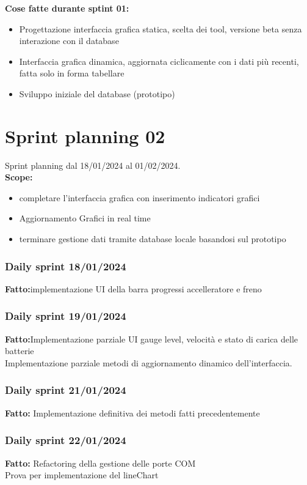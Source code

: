 \documentclass{report}
\begin{document}
\textbf{Cose fatte durante sptint 01:}
\begin{itemize}
\item Progettazione interfaccia grafica statica, scelta dei tool, versione beta senza interazione con il database
\item Interfaccia grafica dinamica, aggiornata ciclicamente con i dati più recenti, fatta solo in forma tabellare
\item Sviluppo iniziale del database (prototipo)
\end{itemize}

\chapter{Sprint planning 02}
Sprint planning dal 18/01/2024 al 01/02/2024.\\

\textbf{Scope:}
\begin{itemize}
\item completare l'interfaccia grafica con inserimento indicatori grafici
\item Aggiornamento Grafici in real time 
\item terminare gestione dati tramite database locale basandosi sul prototipo
\end{itemize}

\subsection{Daily sprint 18/01/2024}
\textbf{Fatto:}implementazione UI della barra progressi accelleratore e freno\\

\subsection{Daily sprint 19/01/2024}
\textbf{Fatto:}Implementazione parziale UI gauge level, velocità e stato di carica delle batterie\\
Implementazione parziale metodi di aggiornamento dinamico dell'interfaccia.

\subsection{Daily sprint 21/01/2024}
\textbf{Fatto:} Implementazione definitiva dei metodi fatti precedentemente

\subsection{Daily sprint 22/01/2024}
\textbf{Fatto:} Refactoring della gestione delle porte COM\\
Prova per implementazione del lineChart
\end{document}
